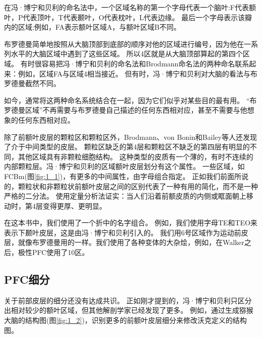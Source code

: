 \par
在冯·博宁和贝利的命名法中，一个区域名称的第一个字母代表一个脑叶:F代表额叶，P代表顶叶，T代表颞叶，O代表枕叶，L代表边缘。
最后一个字母表示该瓣内的区域;例如，FA表示额叶区域A，与额叶区域B不同。
\par
布罗德曼简单地按照从大脑顶部到底部的顺序对他的区域进行编号，因为他在一系列水平的大脑区域中遇到了这些区域。
所以4区就是从大脑顶部算起的第四个区域。
有时很容易把冯·博宁和贝利的命名法和Brodmann命名法的两种命名联系起来：例如，区域FA与区域4相当接近。
但有时，冯·博宁和贝利对大脑的看法与布罗德曼截然不同。
\par
如今，通常将这两种命名系统结合在一起，因为它们似乎对某些目的最有用。
“布罗德曼区域”不再需要与布罗德曼自己描述的任何东西相对应，甚至不需要与他想象的任何东西相对应。
\par
除了前额叶皮层的颗粒区和颗粒区外，Brodmann、von Bonin和Bailey等人还发现了介于中间类型的皮层。
颗粒区缺乏的第4层和颗粒区不缺乏的第四层有明显的不同，其他区域具有非颗粒细胞结构。
这种类型的皮质有一个薄的，有时不连续的内部颗粒层。冯·博宁和贝利的区域额叶皮层划分有这个属性。
一些区域，如FCBm(图\ref{fig:1_1})，有更多的中间属性，由字母组合指定。
正如我们前面所说的，颗粒状和非颗粒状前额叶皮层之间的区别代表了一种有用的简化，而不是一种严格的二分法。
使用定量分析法证实：当人们沿着前额皮质的内侧或眶面朝上移动时，第4层变得更厚、更明显\cite{mackey2010quantitative}。
\par
在这本书中，我们使用了一个折中的名字组合。
例如，我们使用字母TE和TEO来表示下颞叶皮层，这是由冯·博宁和贝利引入的。
我们用6号区域作为运动前皮层，就像布罗德曼用的一样。我们使用了各种变体的大杂烩，例如，在Walker\cite{walker1940cytoarchitectural}之后，极性PFC使用了10区。



\subsection{PFC细分}
关于前部皮层的细分还没有达成共识。
正如刚才提到的，冯·博宁和贝利只区分出相对较少的额叶区域，但其他解剖学家已经发现了更多。
例如，通过生成猕猴大脑的结构图(图\ref{fig:1_2})，识别更多的前额叶皮层细分来修改沃克定义的结构图。


